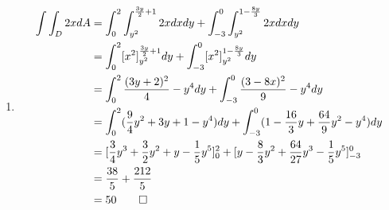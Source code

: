 \documentclass[12pt, a4paper]{article}
\begin{document}
\begin{enumerate}[Q\arabic*.]
  \item 
    \begin{align*}
      \int\int_D 2x dA &= \int^2_0 \int^{\frac{3y}{2}+1}_{y^2}2xdxdy + \int^0_{-3}\int^{1-\frac{8y}{3}}_{y^2}2xdxdy\\
                       &= \int^2_0[x^2]^{\frac{3y}{2}+1}_{y^2}dy + \int^0_{-3}[x^2]^{1-\frac{8y}{3}}_{y^2}dy\\
                       &= \int^2_0 \frac{(3y+2)^2}{4} -y^4 dy + \int^0_{-3} \frac{(3-8x)^2}{9}-y^4 dy\\
                       &= \int^2_0 (\frac{9}{4}y^2+3y+1-y^4)dy + \int^0_{-3}(1-\frac{16}{3}y+\frac{64}{9}y^2-y^4)dy\\
                       &= [\frac{3}{4}y^3+\frac{3}{2}y^2+y-\frac{1}{5}y^5]^2_0 + [y-\frac{8}{3}y^2+\frac{64}{27}y^3-\frac{1}{5}y^5]^0_{-3}\\
                       &= \frac{38}{5} + \frac{212}{5}\\
                       &= 50\qed
    \end{align*}
\end{enumerate}
\end{document}

